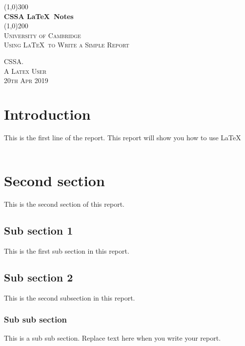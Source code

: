 \documentclass{article}
\begin{document}
\begin{titlepage}
	\begin{center}
		\line(1,0){300}\\
		[0.25in]
		\huge{\textbf{ CSSA \LaTeX\ Notes}}\\
		[2mm]
		\line(1,0){200}\\
		[1.5cm]
		\textsc{\LARGE University of Cambridge}\\
		\textsc{\LARGE Using \LaTeX\ to Write a Simple Report}\\
		[8cm]
	\end{center}
	\begin{flushright}
		\textsc{\large CSSA. \\ A Latex User\\
		20th Apr 2019}
	\end{flushright}
\end{titlepage}
\cleardoublepage
\section{Introduction} 
This is the first line of the report. This report will show you how to use \LaTeX\\\
\lipsum[1]
\section{Second section}
This is the second section of this report.
\subsection{Sub section 1} 
This is the first sub section in this report.
\subsection{Sub section 2} 
This is the second subsection in this report.
\subsubsection{Sub sub section}
This is a sub sub section. Replace text here when you write your report.
\cleardoublepage
\end{document}

